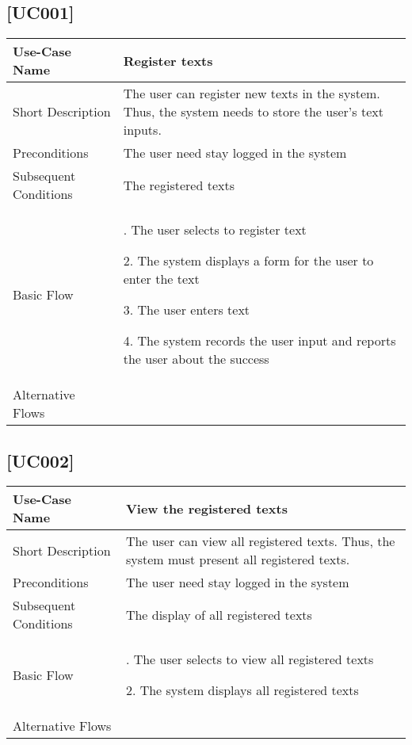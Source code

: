 \documentclass[11pt, twoside, a4paper]{book}
\begin{document}
			\subsection{[UC001]}
				\begin{tabular}{|>{\centering\arraybackslash}m{6cm} |>{\centering\arraybackslash}m{6cm}|}												   \hline
					Use-Case Name 			& Register texts																							\\ \hline
					Short Description  		& The user can register new texts in the system. Thus, the system needs to store the user's text inputs.    \\ \hline	
					Preconditions  			& The user need stay logged in the system      																\\ \hline
					Subsequent Conditions	& The registered texts     																					\\ \hline
					Basic Flow  			& 	1. The user selects to register text
											
												2. The system displays a form for the user to enter the text
											
												3. The user enters text
										
												4. The system records the user input and reports the user about the success								\\ \hline
					Alternative Flows  		&       																									\\ \hline
				\end{tabular}
			
			\subsection{[UC002]}			
				\begin{tabular}{|>{\centering\arraybackslash}m{6cm} |>{\centering\arraybackslash}m{6cm}|}										   \hline
					Use-Case Name 			& [UC002] View the registered texts																	\\ \hline
					Short Description  		& The user can view all registered texts. Thus, the system must present all registered texts.    	\\ \hline	
					Preconditions  			& The user need stay logged in the system      														\\ \hline
					Subsequent Conditions	& The display of all registered texts																\\ \hline
					Basic Flow  			& 	1. The user selects to view all registered texts														
											    
												2. The system displays all registered texts														\\ \hline
				Alternative Flows  		&       																								\\ \hline
			\end{tabular}
\end{document}

